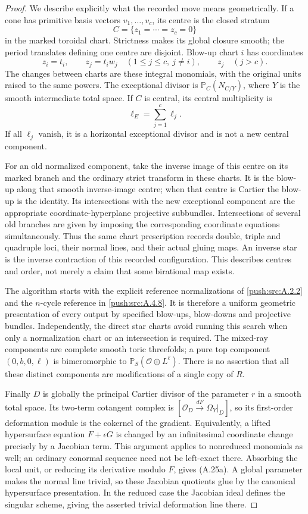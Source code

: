 \begin{proof}
We describe explicitly what the recorded move means
geometrically. If a cone has primitive basis vectors
$v_1,\ldots,v_c$, its centre is the closed stratum
\[
 C=\{z_1=\cdots=z_c=0\}
\]
in the marked toroidal chart. Strictness makes its
global closure smooth; the period translates defining
one centre are disjoint. Blow-up chart $i$ has
coordinates
\[
 z_i=t_i,\qquad z_j=t_i w_j\quad
 (1\leq j\leq c,\ j\ne i),
 \qquad z_j\quad(j>c).
\]
The changes between charts are these integral
monomials, with the original units raised to the
same powers. The exceptional divisor is
$\mathbb P_C(N_{C/Y})$, where $Y$ is the smooth
intermediate total space. If $C$ is central, its
central multiplicity is
\[
 \ell_E=\sum_{j=1}^c\ell_j.
\]
If all $\ell_j$ vanish, it is a horizontal exceptional
divisor and is not a new central component.

For an old normalized component, take the inverse
image of this centre on its marked branch and the
ordinary strict transform in these charts. It is
the blow-up along that smooth inverse-image centre;
when that centre is Cartier the blow-up is the
identity. Its intersections with the new exceptional
component are the appropriate coordinate-hyperplane
projective subbundles. Intersections of several old
branches are given by imposing the corresponding
coordinate equations simultaneously. Thus the same
chart prescription records double, triple and
quadruple loci, their normal lines, and their actual
gluing maps. An inverse star is the inverse
contraction of this recorded configuration. This
describes centres and order, not merely a claim that
some birational map exists.

The algorithm starts with the explicit reference
normalizations of \ref{push:src:A.2.2} and the $n$-cycle reference
in \ref{push:src:A.4.8}. It is therefore a uniform geometric
presentation of every output by specified blow-ups,
blow-downs and projective bundles. Independently,
the direct star charts avoid running this search
when only a normalization chart or an intersection
is required. The mixed-ray components are complete
smooth toric threefolds; a pure top component
$(0,b,0,\ell)$ is bimeromorphic to
$\mathbb P_S(\mathcal O\oplus L^\ell)$.
There is no assertion that all these distinct
components are modifications of a single copy of $R$.

Finally $D$ is globally the principal Cartier
divisor of the parameter $r$ in a smooth total
space. Its two-term cotangent complex is
$[\mathcal O_D\xrightarrow{dF}\Omega_Y|_D]$,
so its first-order deformation module is the
cokernel of the gradient. Equivalently, a lifted
hypersurface equation $F+\epsilon G$ is changed by
an infinitesimal coordinate change precisely by a
Jacobian term. This argument applies to nonreduced
monomials as well; an ordinary conormal sequence
need not be left-exact there. Absorbing the local unit, or reducing its
derivative modulo $F$, gives (A.25a). A global
parameter makes the normal line trivial, so these
Jacobian quotients glue by the canonical
hypersurface presentation. In the reduced case
the Jacobian ideal defines the singular scheme,
giving the asserted trivial deformation line there.


\end{proof}
